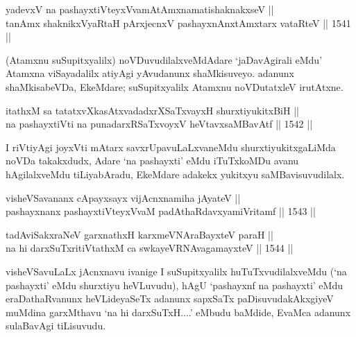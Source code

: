 \begin{shl}
yadevxV na pashayxtiVteyxVvamAtAmxnamatishaknakxseV || \\
tanAmx shaknikxVyaRtaH pArxjecnxV pashayxnAnxtAmx\s tarx vataRteV \hfill || 1541 ||  
\end{shl}

\begin{artha}
(Atamxnu suSupitxyalilx) noVDuvudilalxveMdAdare `jaDavAgirali eMdu' Atamxna viSayadalilx atiyAgi yAvudanunx shaMkisuveyo. adanunx shaMkisabeVDa, EkeMdare; suSupitxyalilx Atamxnu noVDutatxleV irutAtxne.
\end{artha}


\begin{shl}
itathxM sa tatatxvXkasAtxvadadxrXSaTxvayxH shurxtiyukitxBiH || \\
na pashayxtiVti na punadarxRSaTxvoyxV heVtavxsaMBavAtf \hfill || 1542 ||  
\end{shl}

\begin{artha}
I riVtiyAgi joyxVti mAtarx savxrUpavuLaLxvaneMdu shurxtiyukitxgaLiMda noVDa takakxdudx, Adare `na pashayxti' eMdu iTuTxkoMDu avanu hAgilalxveMdu tiLiyabAradu, EkeMdare adakekx yukitxyu saMBavisuvudilalx.
\end{artha}



\begin{shl}
visheVSavananx cApayxsayx vijAcnxnamiha jAyateV || \\
pashayxnanx pashayxtiVteyxVvaM padAthaRdavxyamiVritamf \hfill || 1543 ||  
\end{shl}
				
\begin{shl}
tadAviSakxraNeV garxnathxH karxmeVNA\s \s raBayxteV paraH || \\
na hi darxSuTxritiVtathxM ca swkayeVRNAvagamayxteV \hfill || 1544 ||  
\end{shl}

\begin{artha}
visheVSavuLaLx jAcnxnavu ivanige I suSupitxyalilx huTuTxvudilalxveMdu (`na pashayxti' eMdu shurxtiyu heVLuvudu), hAgU `pashayxnf na pashayxti' eMdu eraDathaRvanunx heVLideyaSeTx adanunx sapxSaTx paDisuvudakAkxgiyeV muMdina garxMthavu `na hi darxSuTxH....' eMbudu baMdide, EvaMca adanunx sulaBavAgi tiLisuvudu.
\end{artha}

